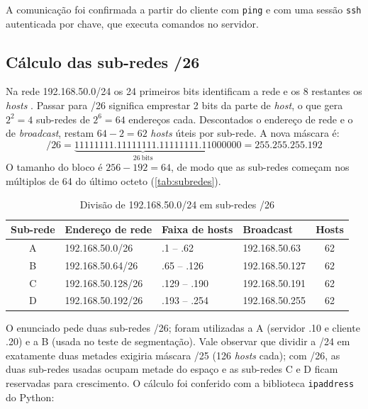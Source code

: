 A comunicação foi confirmada a partir do cliente com \texttt{ping} e com uma sessão
\texttt{ssh} autenticada por chave, que executa comandos no servidor.



\subsection{Cálculo das sub-redes /26}

Na rede 192.168.50.0/24 os 24 primeiros bits identificam a rede e os 8 restantes os
\textit{hosts} \cite{rfc950,rfc4632}. Passar para /26 significa emprestar 2 bits da parte
de \textit{host}, o que gera $2^2 = 4$ sub-redes de $2^6 = 64$ endereços cada. Descontados
o endereço de rede e o de \textit{broadcast}, restam $64 - 2 = 62$ \textit{hosts} úteis por
sub-rede. A nova máscara é:
\[
  /26 = \underbrace{11111111.11111111.11111111.11}_{26\ \text{bits}}000000 = 255.255.255.192
\]
O tamanho do bloco é $256 - 192 = 64$, de modo que as sub-redes começam nos múltiplos de 64
do último octeto (\autoref{tab:subredes}).

\begin{table}[htbp]
  \centering
  \caption{Divisão de 192.168.50.0/24 em sub-redes /26}\label{tab:subredes}
  \begin{tabular}{clllc}
    \hline
    \textbf{Sub-rede} & \textbf{Endereço de rede} & \textbf{Faixa de hosts} & \textbf{Broadcast} & \textbf{Hosts} \\
    \hline
    A & 192.168.50.0/26   & .1 -- .62    & 192.168.50.63  & 62 \\
    B & 192.168.50.64/26  & .65 -- .126  & 192.168.50.127 & 62 \\
    C & 192.168.50.128/26 & .129 -- .190 & 192.168.50.191 & 62 \\
    D & 192.168.50.192/26 & .193 -- .254 & 192.168.50.255 & 62 \\
    \hline
  \end{tabular}
\end{table}

O enunciado pede duas sub-redes /26; foram utilizadas a A (servidor .10 e cliente .20) e
a B (usada no teste de segmentação). Vale observar que dividir a /24 em exatamente duas
metades exigiria máscara /25 (126 \textit{hosts} cada); com /26, as duas sub-redes usadas
ocupam metade do espaço e as sub-redes C e D ficam reservadas para crescimento. O cálculo
foi conferido com a biblioteca \texttt{ipaddress} do Python:

